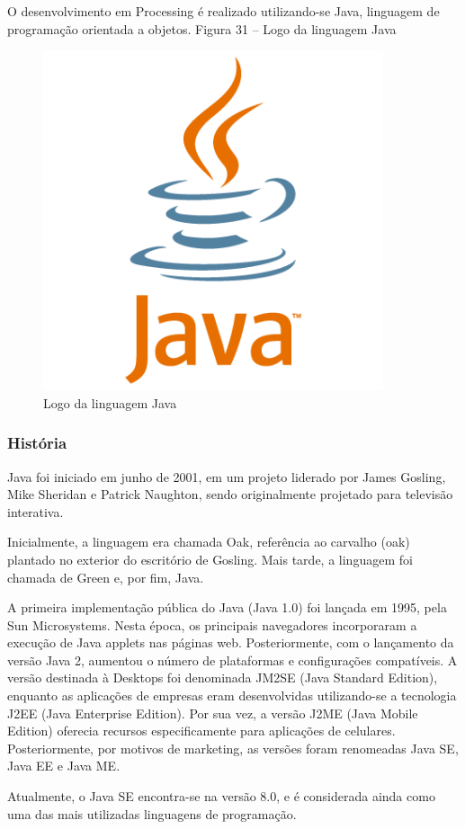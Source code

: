 	O desenvolvimento em Processing é realizado utilizando-se Java, linguagem de programação orientada a objetos.
	Figura 31 – Logo da linguagem Java
		 \begin{figure}[h!]
	\caption{\label{fig_java}  Logo da linguagem Java}
	\begin{center}
		\includegraphics[width=100mm]{java-logo-vector.png}	
	\end{center}
\end{figure}

	\subsubsection{História}\label{subsubsec-histjava}
	Java foi iniciado em junho de 2001, em um projeto liderado por James Gosling, Mike Sheridan e Patrick Naughton, sendo originalmente projetado para televisão interativa.\par
	Inicialmente, a linguagem era chamada Oak, referência ao carvalho (oak) plantado no exterior do escritório de Gosling. Mais tarde, a linguagem foi chamada de Green e, por fim, Java.\par
	A primeira implementação pública do Java (Java 1.0) foi lançada em 1995, pela Sun Microsystems. Nesta época, os principais navegadores incorporaram a execução de Java applets nas páginas web. Posteriormente, com o lançamento da versão Java 2, aumentou o número de plataformas e configurações compatíveis. A versão destinada à Desktops foi denominada JM2SE (Java Standard Edition), enquanto as aplicações de empresas eram desenvolvidas utilizando-se a tecnologia J2EE (Java Enterprise Edition). Por sua vez, a versão J2ME (Java Mobile Edition) oferecia recursos especificamente para aplicações de celulares. Posteriormente, por motivos de marketing, as versões foram renomeadas Java SE, Java EE e Java ME.\par
	Atualmente, o Java SE encontra-se na versão 8.0, e é considerada ainda como uma das mais utilizadas linguagens de programação.\cite{java}

